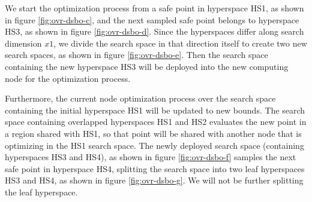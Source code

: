 We start the optimization process from a safe point in hyperspace HS1, as shown in figure \ref{fig:ovr-dsbo-c}, and the next sampled safe point belongs to hyperspace HS3, as shown in figure \ref{fig:ovr-dsbo-d}. Since the hyperspaces differ along search dimension $x1$, we divide the search space in that direction itself to create two new search spaces, as shown in figure \ref{fig:ovr-dsbo-e}. Then the search space containing the new hyperspace HS3 will be deployed into the new computing node for the optimization process.

Furthermore, the current node optimization process over the search space containing the initial hyperspace HS1 will be updated to new bounds. The search space containing overlapped hyperspaces HS1 and HS2 evaluates the new point in a region shared with HS1, so that point will be shared with another node that is optimizing in the HS1 search space.
The newly deployed search space (containing hyperspaces HS3 and HS4), as shown in figure \ref{fig:ovr-dsbo-f} samples the next safe point in hyperspace HS4, splitting the search space into two leaf hyperspaces HS3 and HS4, as shown in figure \ref{fig:ovr-dsbo-g}. We will not be further splitting the leaf hyperspace.
